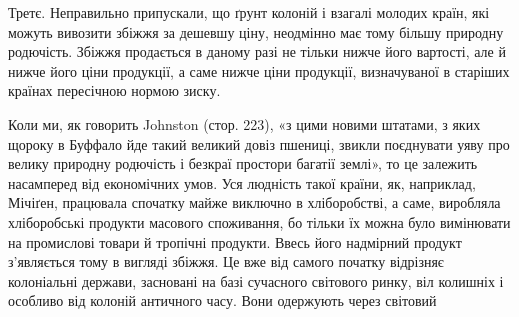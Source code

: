 Третє. Неправильно припускали, що ґрунт колоній і взагалі молодих
країн, які можуть вивозити збіжжя за дешевшу ціну, неодмінно має тому більшу
природну родючість. Збіжжя продається в даному разі не тільки нижче його
вартості, але й нижче його ціни продукції, а саме нижче ціни продукції, визначуваної
в старіших країнах пересічною нормою зиску.

Коли ми, як говорить Johnston (стор. 223), «з цими новими штатами, з
яких щороку в Буффало йде такий великий довіз пшениці, звикли поєднувати
уяву про велику природну родючість і безкраї простори багатії землі», то це
залежить насамперед від економічних умов. Уся людність такої країни, як, наприклад,
Мічіґен, працювала спочатку майже виключно в хліборобстві, а саме,
виробляла хліборобські продукти масового споживання, бо тільки їх можна було
вимінювати на промислові товари й тропічні продукти. Ввесь його надмірний продукт
з’являється тому в вигляді збіжжя. Це вже від самого початку відрізняє
колоніальні держави, засновані на базі сучасного світового ринку, віл
колишніх і особливо від колоній античного часу. Вони одержують через світовий
